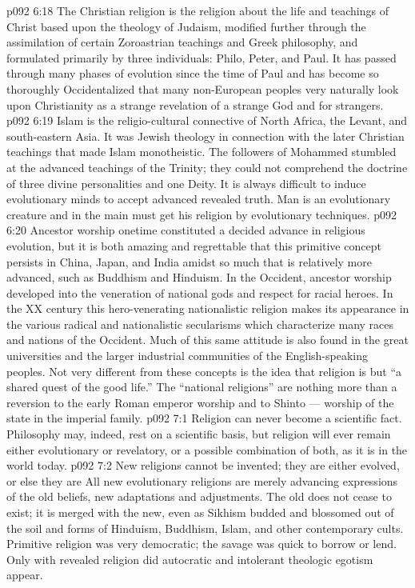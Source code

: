 \vs p092 6:18 The Christian religion is the religion about the life and teachings of Christ based upon the theology of Judaism, modified further through the assimilation of certain Zoroastrian teachings and Greek philosophy, and formulated primarily by three individuals: Philo, Peter, and Paul. It has passed through many phases of evolution since the time of Paul and has become so thoroughly Occidentalized that many non\hyp{}European peoples very naturally look upon Christianity as a strange revelation of a strange God and for strangers.
\vs p092 6:19 Islam is the religio\hyp{}cultural connective of North Africa, the Levant, and south\hyp{}eastern Asia. It was Jewish theology in connection with the later Christian teachings that made Islam monotheistic. The followers of Mohammed stumbled at the advanced teachings of the Trinity; they could not comprehend the doctrine of three divine personalities and one Deity. It is always difficult to induce evolutionary minds  to accept advanced revealed truth. Man is an evolutionary creature and in the main must get his religion by evolutionary techniques.
\vs p092 6:20 \pc Ancestor worship onetime constituted a decided advance in religious evolution, but it is both amazing and regrettable that this primitive concept persists in China, Japan, and India amidst so much that is relatively more advanced, such as Buddhism and Hinduism. In the Occident, ancestor worship developed into the veneration of national gods and respect for racial heroes. In the XX century this hero\hyp{}venerating nationalistic religion makes its appearance in the various radical and nationalistic secularisms which characterize many races and nations of the Occident. Much of this same attitude is also found in the great universities and the larger industrial communities of the English\hyp{}speaking peoples. Not very different from these concepts is the idea that religion is but “a shared quest of the good life.” The “national religions” are nothing more than a reversion to the early Roman emperor worship and to Shinto --- worship of the state in the imperial family.
\vs p092 7:1 Religion can never become a scientific fact. Philosophy may, indeed, rest on a scientific basis, but religion will ever remain either evolutionary or revelatory, or a possible combination of both, as it is in the world today.
\vs p092 7:2 New religions cannot be invented; they are either evolved, or else they are  All new evolutionary religions are merely advancing expressions of the old beliefs, new adaptations and adjustments. The old does not cease to exist; it is merged with the new, even as Sikhism budded and blossomed out of the soil and forms of Hinduism, Buddhism, Islam, and other contemporary cults. Primitive religion was very democratic; the savage was quick to borrow or lend. Only with revealed religion did autocratic and intolerant theologic egotism appear.
